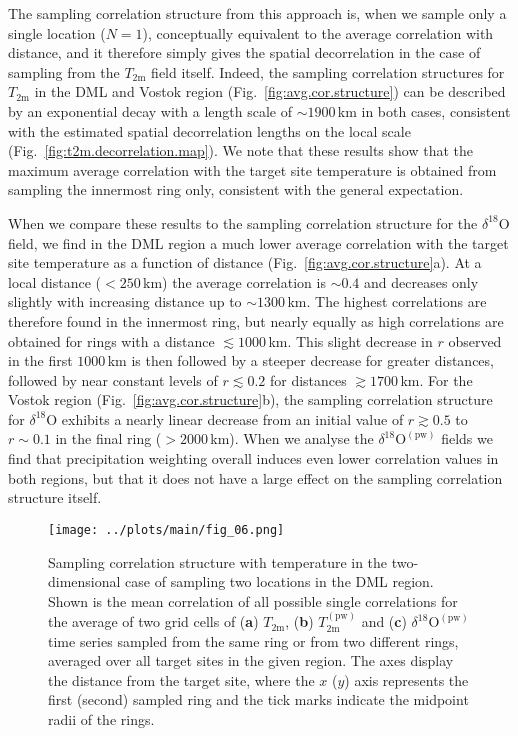 \documentclass[cp, manuscript]{copernicus}
\begin{document}
The sampling correlation structure from this approach is, when we sample only a
single location ($N=1$), conceptually equivalent to the average correlation with
distance, and it therefore simply gives the spatial decorrelation in the case of
sampling from the $T_{\mathrm{2m}}$ field itself. Indeed, the sampling
correlation structures for $T_{\mathrm{2m}}$ in the DML and Vostok region
(Fig.~\ref{fig:avg.cor.structure}) can be described by an exponential decay with
a length scale of $\sim1900$\,km in both cases, consistent with the estimated
spatial decorrelation lengths on the local scale
(Fig.~\ref{fig:t2m.decorrelation.map}). We note that these results show that the
maximum average correlation with the target site temperature is obtained from
sampling the innermost ring only, consistent with the general expectation.

When we compare these results to the sampling correlation structure for the
$\delta^{18}\mathrm{O}$ field, we find in the DML region a much lower average
correlation with the target site temperature as a function of distance
(Fig.~\ref{fig:avg.cor.structure}a). At a local distance ($<250$\,km) the
average correlation is $\sim0.4$ and decreases only slightly with increasing
distance up to $\sim1300$\,km. The highest correlations are therefore found in
the innermost ring, but nearly equally as high correlations are obtained for
rings with a distance $\lesssim1000$\,km. This slight decrease in $r$ observed
in the first $1000$\,km is then followed by a steeper decrease for greater
distances, followed by near constant levels of $r\lesssim0.2$ for distances
$\gtrsim1700$\,km. For the Vostok region (Fig.~\ref{fig:avg.cor.structure}b),
the sampling correlation structure for $\delta^{18}\mathrm{O}$ exhibits a nearly
linear decrease from an initial value of $r\gtrsim0.5$ to $r\sim0.1$ in the
final ring ($>2000$\,km).  When we analyse the
$\delta^{18}\mathrm{O}^{\mathrm{(pw)}}$ fields we find that precipitation
weighting overall induces even lower correlation values in both regions, but
that it does not have a large effect on the sampling correlation structure
itself.

\begin{figure*}[t]%
\centering
\texttt{[image: ../plots/main/fig\_06.png]}
\caption{%
  Sampling correlation structure with temperature in the two-dimensional case
  of sampling two locations in the DML region. Shown is the mean correlation of
  all possible single correlations for the average of two grid cells of
  (\textbf{a}) $T_{\mathrm{2m}}$, (\textbf{b}) $T_{\mathrm{2m}}^{\mathrm{(pw)}}$
  and (\textbf{c}) $\delta^{18}\mathrm{O}^{\mathrm{(pw)}}$ time series sampled
  from the same ring or from two different rings, averaged over all target sites
  in the given region. The axes display the distance from the target site, where
  the $x$ ($y$) axis represents the first (second) sampled ring and the tick
  marks indicate the midpoint radii of the rings.}
\label{fig:two-core-correlation}%
\end{figure*}%
\end{document}
